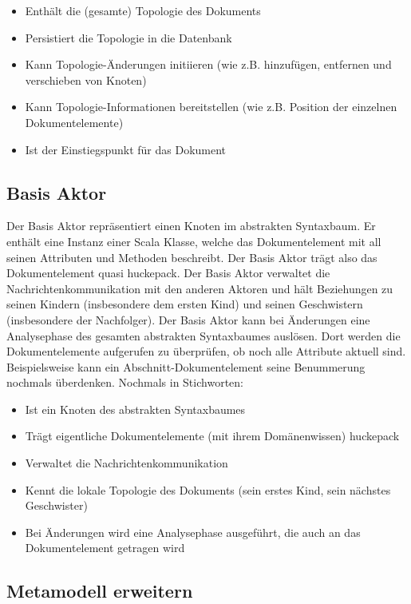  
\begin{itemize}

\item Enthält die (gesamte) Topologie des Dokuments
\item Persistiert die Topologie in die Datenbank
\item Kann Topologie-Änderungen initiieren (wie z.B. hinzufügen, entfernen und verschieben von Knoten)
\item Kann Topologie-Informationen bereitstellen (wie z.B. Position der einzelnen Dokumentelemente)
\item Ist der Einstiegspunkt für das Dokument
\end{itemize}
 
\subsection{Basis Aktor}\label{}
 
Der Basis Aktor repräsentiert einen Knoten im abstrakten Syntaxbaum. Er enthält eine Instanz einer Scala Klasse, welche das Dokumentelement mit all seinen Attributen und Methoden beschreibt. Der Basis Aktor trägt also das Dokumentelement quasi huckepack. Der Basis Aktor verwaltet die Nachrichtenkommunikation mit den anderen Aktoren und hält Beziehungen zu seinen Kindern (insbesondere dem ersten Kind) und seinen Geschwistern (insbesondere der Nachfolger). Der Basis Aktor kann bei Änderungen eine Analysephase des gesamten abstrakten Syntaxbaumes auslösen. Dort werden die Dokumentelemente aufgerufen zu überprüfen, ob noch alle Attribute aktuell sind. Beispielsweise kann ein Abschnitt-Dokumentelement seine Benummerung nochmals überdenken. Nochmals in Stichworten:

 
\begin{itemize}

\item Ist ein Knoten des abstrakten Syntaxbaumes
\item Trägt eigentliche Dokumentelemente (mit ihrem Domänenwissen) huckepack
\item Verwaltet die Nachrichtenkommunikation
\item Kennt die lokale Topologie des Dokuments (sein erstes Kind, sein nächstes Geschwister)
\item Bei Änderungen wird eine Analysephase ausgeführt, die auch an das Dokumentelement getragen wird
\end{itemize}
 
\subsection{Metamodell erweitern}\label{metamodell-impl}
 
